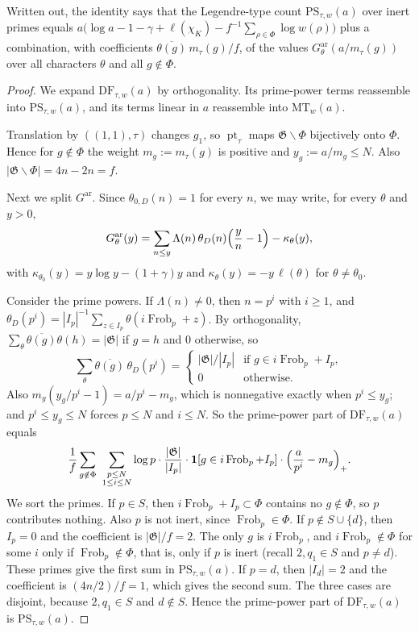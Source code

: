 \documentclass[11pt]{amsbook}
\theoremstyle{plain}
\theoremstyle{definition}
\theoremstyle{remark}
\numberwithin{equation}{section}
\numberwithin{figure}{chapter}
\numberwithin{table}{chapter}
\newcommand{\Frob}{\operatorname{Frob}}
\newcommand{\GG}{\mathfrak{G}}
\newcommand{\pt}{\operatorname{pt}}
\newcommand{\GPsi}{G^{\mathrm{ar}}}
\newcommand{\PS}{\mathrm{PS}}
\newcommand{\MT}{\mathrm{MT}}
\newcommand{\DF}{\mathrm{DF}}
\begin{document}
\noindent Written out, the identity says that the Legendre-type count
$\PS_{\tau,w}(a)$ over inert primes equals
$a\bigl(\log a-1-\gamma+\ell(\chi_K)-f^{-1}\sum_{\rho\in\Phi}\log
w(\rho)\bigr)$ plus a combination, with coefficients
$\overline{\theta(g)}\,m_\tau(g)/f$, of the values
$\GPsi_\theta(a/m_\tau(g))$ over all characters $\theta$ and all
$g\notin\Phi$.

\begin{proof}
We expand $\DF_{\tau,w}(a)$ by orthogonality. Its prime-power terms
reassemble into $\PS_{\tau,w}(a)$, and its terms linear in $a$
reassemble into $\MT_w(a)$.

Translation by $((1,1),\tau)$ changes $g_1$,
so $\pt_\tau$ maps $\GG\smallsetminus\Phi$ bijectively onto $\Phi$.
Hence for $g\notin\Phi$ the weight $m_g:=m_\tau(g)$ is positive and
$y_g:=a/m_g\le N$. Also $|\GG\smallsetminus\Phi|=4n-2n=f$.

Next we split $\GPsi$. Since $\theta_{0,D}(n)=1$ for every $n$, we
may write, for every $\theta$ and $y>0$,
\[
\GPsi_\theta(y)=\sum_{n\le y}\Lambda(n)\,\theta_D(n)\Bigl(\frac yn-1
\Bigr)-\kappa_\theta(y),
\]
with $\kappa_{\theta_0}(y)=y\log y-(1+\gamma)y$ and
$\kappa_\theta(y)=-y\,\ell(\theta)$ for $\theta\ne\theta_0$.

Consider the prime powers. If $\Lambda(n)\ne0$, then $n=p^i$ with $i\ge1$,
and $\theta_D(p^i)=|I_p|^{-1}\sum_{z\in I_p}\theta(i\Frob_p+z)$. By
orthogonality, $\sum_\theta\overline{\theta(g)}\theta(h)=|\GG|$ if
$g=h$ and $0$ otherwise, so
\[
\sum_\theta\overline{\theta(g)}\,\theta_D(p^i)=
\begin{cases}|\GG|/|I_p|&\text{if }g\in i\Frob_p+I_p,\\
0&\text{otherwise.}\end{cases}
\]
Also $m_g(y_g/p^i-1)=a/p^i-m_g$, which is nonnegative exactly
when $p^i\le y_g$; and $p^i\le y_g\le N$ forces $p\le N$ and $i\le N$.
So the prime-power part of $\DF_{\tau,w}(a)$ equals
\[
\frac1f\sum_{g\notin\Phi}\ \sum_{\substack{p\le N\\ 1\le i\le N}}
\log p\cdot\frac{|\GG|}{|I_p|}\cdot\mathbf 1[g\in i\Frob_p+I_p]\cdot
\Bigl(\frac a{p^i}-m_g\Bigr)_+.
\]
We sort the primes. If $p\in S$, then $i\Frob_p+I_p\subset\Phi$
contains no $g\notin\Phi$, so $p$ contributes nothing. Also $p$ is not
inert, since $\Frob_p\in\Phi$. If $p\notin S\cup\{d\}$, then $I_p=0$
and the coefficient is $|\GG|/f=2$. The only $g$ is $i\Frob_p$, and
$i\Frob_p\notin\Phi$ for some $i$ only if $\Frob_p\notin\Phi$, that is,
only if $p$ is inert (recall $2,q_1\in S$ and $p\ne d$). These primes
give the first sum in $\PS_{\tau,w}(a)$. If $p=d$, then $|I_d|=2$ and
the coefficient is $(4n/2)/f=1$, which gives the second sum. The three
cases are disjoint, because $2,q_1\in S$ and $d\notin S$. Hence the
prime-power part of $\DF_{\tau,w}(a)$ is $\PS_{\tau,w}(a)$.


\end{proof}
\end{document}
